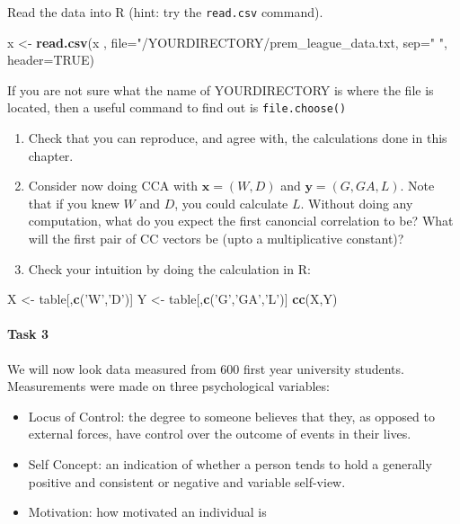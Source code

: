 \documentclass[]{book}
\newenvironment{Shaded}{\begin{snugshade}}{\end{snugshade}}
\newcommand{\DataTypeTok}[1]{\textcolor[rgb]{0.13,0.29,0.53}{#1}}
\newcommand{\KeywordTok}[1]{\textcolor[rgb]{0.13,0.29,0.53}{\textbf{#1}}}
\newcommand{\NormalTok}[1]{#1}
\newcommand{\StringTok}[1]{\textcolor[rgb]{0.31,0.60,0.02}{#1}}
\providecommand{\tightlist}{%
  \setlength{\itemsep}{0pt}\setlength{\parskip}{0pt}}
\let\oldparagraph\paragraph
\renewcommand{\paragraph}[1]{\oldparagraph{#1}\mbox{}}
\theoremstyle{definition}
\theoremstyle{definition}
\theoremstyle{definition}
\theoremstyle{remark}
\begin{document}
Read the data into R (hint: try the \texttt{read.csv} command).

\begin{Shaded}
\begin{Highlighting}[]
\NormalTok{x <-}\StringTok{ }\KeywordTok{read.csv}\NormalTok{(x , }\DataTypeTok{file=}\StringTok{"/YOURDIRECTORY/prem_league_data.txt, sep="} \StringTok{", header=TRUE)}
\end{Highlighting}
\end{Shaded}

If you are not sure what the name of YOURDIRECTORY is where the file is located, then a useful command to find out is \texttt{file.choose()}

\begin{enumerate}
\def\labelenumi{\roman{enumi}.}
\item
  Check that you can reproduce, and agree with, the calculations done in this chapter.
\item
  Consider now doing CCA with \(\mathbf x=(W,D)\) and \(\mathbf y=(G,GA, L)\). Note that if you knew \(W\) and \(D\), you could calculate \(L\). Without doing any computation, what do you expect the first canoncial correlation to be? What will the first pair of CC vectors be (upto a multiplicative constant)?
\item
  Check your intuition by doing the calculation in R:
\end{enumerate}

\begin{Shaded}
\begin{Highlighting}[]
\NormalTok{X <-}\StringTok{ }\NormalTok{table[,}\KeywordTok{c}\NormalTok{(}\StringTok{'W'}\NormalTok{,}\StringTok{'D'}\NormalTok{)] }
\NormalTok{Y <-}\StringTok{ }\NormalTok{table[,}\KeywordTok{c}\NormalTok{(}\StringTok{'G'}\NormalTok{,}\StringTok{'GA'}\NormalTok{,}\StringTok{'L'}\NormalTok{)] }
\KeywordTok{cc}\NormalTok{(X,Y)}
\end{Highlighting}
\end{Shaded}

\hypertarget{task-3}{%
\paragraph{Task 3}\label{task-3}}

We will now look data measured from 600 first year university students. Measurements were made on three psychological variables:

\begin{itemize}
\tightlist
\item
  Locus of Control: the degree to someone believes that they, as opposed to external forces, have control over the outcome of events in their lives.
\item
  Self Concept: an indication of whether a person tends to hold a generally positive and consistent or negative and variable self-view.
\item
  Motivation: how motivated an individual is
\end{itemize}
\end{document}
